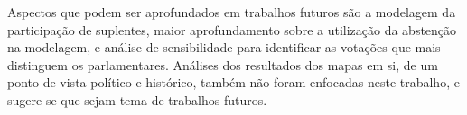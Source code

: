\documentclass[
	article,			%
	12pt,				%
	oneside,			%
	a4paper,			%
	english,			%
	brazil,				%
	sumario=tradicional,
	oldfontcommands %
	]{abntex2}
\begin{document}
Aspectos que podem ser aprofundados em trabalhos futuros são a modelagem da participação de suplentes, maior aprofundamento sobre a utilização da abstenção na modelagem, e análise de sensibilidade para identificar as votações que mais distinguem os parlamentares. 
%
Análises dos resultados dos mapas em si, de um ponto de vista político e histórico, também não foram enfocadas neste trabalho, e sugere-se que sejam tema de trabalhos futuros.


{}
 
\end{document}
